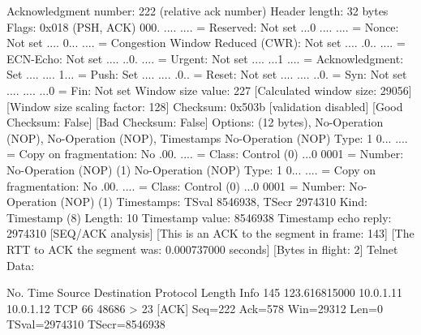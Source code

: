     Acknowledgment number: 222    (relative ack number)
    Header length: 32 bytes
    Flags: 0x018 (PSH, ACK)
        000. .... .... = Reserved: Not set
        ...0 .... .... = Nonce: Not set
        .... 0... .... = Congestion Window Reduced (CWR): Not set
        .... .0.. .... = ECN-Echo: Not set
        .... ..0. .... = Urgent: Not set
        .... ...1 .... = Acknowledgment: Set
        .... .... 1... = Push: Set
        .... .... .0.. = Reset: Not set
        .... .... ..0. = Syn: Not set
        .... .... ...0 = Fin: Not set
    Window size value: 227
    [Calculated window size: 29056]
    [Window size scaling factor: 128]
    Checksum: 0x503b [validation disabled]
        [Good Checksum: False]
        [Bad Checksum: False]
    Options: (12 bytes), No-Operation (NOP), No-Operation (NOP), Timestamps
        No-Operation (NOP)
            Type: 1
                0... .... = Copy on fragmentation: No
                .00. .... = Class: Control (0)
                ...0 0001 = Number: No-Operation (NOP) (1)
        No-Operation (NOP)
            Type: 1
                0... .... = Copy on fragmentation: No
                .00. .... = Class: Control (0)
                ...0 0001 = Number: No-Operation (NOP) (1)
        Timestamps: TSval 8546938, TSecr 2974310
            Kind: Timestamp (8)
            Length: 10
            Timestamp value: 8546938
            Timestamp echo reply: 2974310
    [SEQ/ACK analysis]
        [This is an ACK to the segment in frame: 143]
        [The RTT to ACK the segment was: 0.000737000 seconds]
        [Bytes in flight: 2]
Telnet
    Data: 

No.     Time           Source                Destination           Protocol Length Info
    145 123.616815000  10.0.1.11             10.0.1.12             TCP      66     48686 > 23 [ACK] Seq=222 Ack=578 Win=29312 Len=0 TSval=2974310 TSecr=8546938

